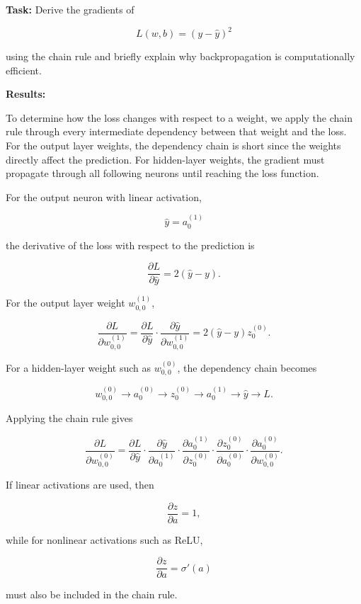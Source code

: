 \documentclass{article}
\begin{document}
\textbf{Task:} Derive the gradients of

\[
L(w,b) = (y-\hat{y})^2
\]

using the chain rule and briefly explain why backpropagation is computationally efficient.

\vspace{0.3cm}

\textbf{Results:}

To determine how the loss changes with respect to a weight, we apply the chain rule through every intermediate dependency between that weight and the loss. For the output layer weights, the dependency chain is short since the weights directly affect the prediction. For hidden-layer weights, the gradient must propagate through all following neurons until reaching the loss function.

For the output neuron with linear activation,

\[
\hat{y} = a_0^{(1)}
\]

the derivative of the loss with respect to the prediction is

\[
\frac{\partial L}{\partial \hat{y}} = 2(\hat{y}-y).
\]

For the output layer weight \(w_{0,0}^{(1)}\),

\[
\frac{\partial L}{\partial w_{0,0}^{(1)}}
=
\frac{\partial L}{\partial \hat{y}}
\cdot
\frac{\partial \hat{y}}{\partial w_{0,0}^{(1)}}
=
2(\hat{y}-y)z_0^{(0)}.
\]

For a hidden-layer weight such as \(w_{0,0}^{(0)}\), the dependency chain becomes

\[
w_{0,0}^{(0)}
\rightarrow
a_0^{(0)}
\rightarrow
z_0^{(0)}
\rightarrow
a_0^{(1)}
\rightarrow
\hat{y}
\rightarrow
L.
\]

Applying the chain rule gives

\[
\frac{\partial L}{\partial w_{0,0}^{(0)}}
=
\frac{\partial L}{\partial \hat{y}}
\cdot
\frac{\partial \hat{y}}{\partial a_0^{(1)}}
\cdot
\frac{\partial a_0^{(1)}}{\partial z_0^{(0)}}
\cdot
\frac{\partial z_0^{(0)}}{\partial a_0^{(0)}}
\cdot
\frac{\partial a_0^{(0)}}{\partial w_{0,0}^{(0)}}.
\]

If linear activations are used, then

\[
\frac{\partial z}{\partial a}=1,
\]

while for nonlinear activations such as ReLU,

\[
\frac{\partial z}{\partial a}=\sigma'(a)
\]

must also be included in the chain rule.
\end{document}
